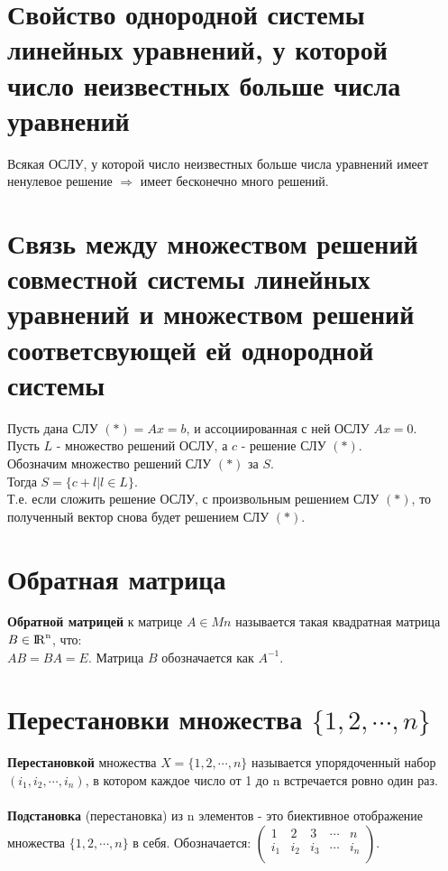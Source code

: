 \documentclass[a4paper,11pt]{report}
\DeclareMathOperator{\Mn}{{\rm I\!R}^{n}}
\begin{document}
\section{Свойство однородной системы линейных уравнений, у которой число неизвестных больше числа уравнений}
Всякая ОСЛУ, у которой число неизвестных больше числа уравнений имеет ненулевое решение $\Rightarrow$ имеет бесконечно много решений.
\section{Связь между множеством решений совместной системы линейных уравнений
и множеством решений соответсвующей ей однородной системы}
Пусть дана СЛУ $(*) = Ax = b $, и ассоциированная с ней ОСЛУ $Ax = 0$.\\
Пусть $L$ - множество решений ОСЛУ, а $c$ - решение СЛУ $(*)$.\\
Обозначим множество решений СЛУ $(*)$ за $S$.\\
Тогда $S = \{c + l | l \in L\}$.\\
Т.е. если сложить решение ОСЛУ, с произвольным решением СЛУ $(*)$, то полученный вектор снова будет решением СЛУ $(*)$.
\section{Обратная матрица}
\textbf{Обратной матрицей} к матрице $A \in Mn$ называется такая квадратная матрица $B \in \Mn$, что:\\
$AB = BA = E$. Матрица $B$ обозначается как $A^{-1}$.
\section{Перестановки множества $\{1, 2, \cdots, n\}$}
\textbf{Перестановкой} множества $X = \{1, 2, \cdots, n\}$ называется упорядоченный набор $(i_1, i_2, \cdots, i_n)$, 
в котором каждое число от 1 до n встречается ровно один раз.\\
\\
\textbf{Подстановка} (перестановка) из n элементов - это биективное отображение множества $\{1, 2, \cdots, n\}$ в себя. 
Обозначается: $
\begin{pmatrix}
 1 & 2 & 3 & \cdots & n\\
 i_1 & i_2 & i_3 & \cdots & i_n\\
\end{pmatrix}
$.
\end{document}
